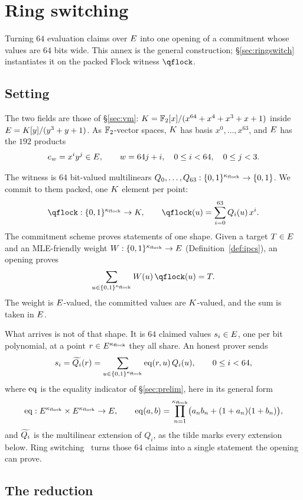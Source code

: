 \section{Ring switching}\label{annex:rs}

Turning $64$ evaluation claims over $E$ into one opening of a commitment whose values are $64$ bits wide. This annex is the general construction; \S\ref{sec:ringswitch} instantiates it on the packed Flock witness $\qflock$.

\subsection{Setting}\label{rs:setting}

The two fields are those of \S\ref{sec:vm}: $K=\mathbb{F}_2[x]/(x^{64}+x^4+x^3+x+1)$ inside $E=K[y]/(y^3+y+1)$. As $\mathbb{F}_2$-vector spaces, $K$ has basis $x^0,\dots,x^{63}$, and $E$ has the $192$ products
\[
e_w=x^iy^j\in E,\qquad w=64j+i,\quad 0\le i<64,\quad 0\le j<3.
\]

The witness is $64$ bit-valued multilinears $Q_0,\dots,Q_{63}:\{0,1\}^{\kappa_{\mathrm{flock}}}\to\{0,1\}$. We commit to them packed, one $K$ element per point:
\[
\qflock:\cube{\nflock}\to\K,\qquad \qflock(u)=\sum_{i=0}^{63}Q_i(u)\,x^i.
\]
The commitment scheme proves statements of one shape. Given a target $T\in E$ and an MLE-friendly weight $W:\{0,1\}^{\kappa_{\mathrm{flock}}}\to E$ (Definition~\ref{def:ipcs}), an opening proves
\[
\sum_{u\in\cube{\nflock}}W(u)\,\qflock(u)=T.
\]
The weight is $E$-valued, the committed values are $K$-valued, and the sum is taken in $E$.

What arrives is not of that shape. It is $64$ claimed values $s_i\in E$, one per bit polynomial, at a point $r\in E^{\kappa_{\mathrm{flock}}}$ they all share. An honest prover sends
\[
s_i=\widetilde{Q_i}(r)=\sum_{u\in\{0,1\}^{\kappa_{\mathrm{flock}}}}\operatorname{eq}(r,u)\,Q_i(u),\qquad 0\le i<64,
\]
where $\operatorname{eq}$ is the equality indicator of \S\ref{sec:prelim}, here in its general form
\[
\operatorname{eq}:E^{\kappa_{\mathrm{flock}}}\times E^{\kappa_{\mathrm{flock}}}\to E,
\qquad
\operatorname{eq}(a,b)=\prod_{n=1}^{\kappa_{\mathrm{flock}}}\bigl(a_nb_n+(1+a_n)(1+b_n)\bigr),
\]
and $\widetilde{Q_i}$ is the multilinear extension of $Q_i$, as the tilde marks every extension below.
Ring switching~\cite{DP26} turns those $64$ claims into a single statement the opening can prove.

\subsection{The reduction}\label{rs:reduction}

